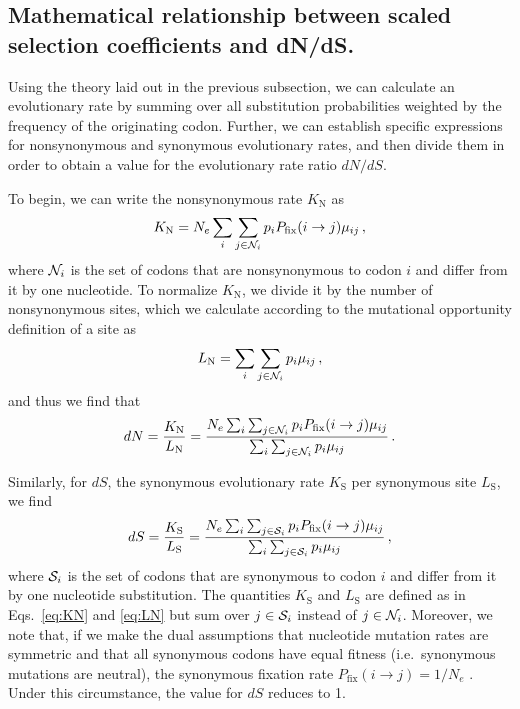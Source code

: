 \documentclass{pnastwo}
\begin{document}
\begin{article}
		
\subsection*{Mathematical relationship between scaled selection coefficients and dN/dS.} 

Using the theory laid out in the previous subsection, we can calculate an evolutionary rate by summing over all substitution probabilities weighted by the frequency of the originating codon. Further, we can establish specific expressions for nonsynonymous and synonymous evolutionary rates, and then divide them in order to obtain a value for the evolutionary rate ratio $dN/dS$.

To begin, we can write the nonsynonymous rate $K_\text{N}$ as 
\begin{equation}\label{eq:KN}
	K_\text{N} = N_e \sum_i \sum_{j \in {\cal N}_i} p_i P_\text{fix}(i \rightarrow j) \mu_{ij}\,,
\end{equation}
where ${\cal N}_i$ is the set of codons that are nonsynonymous to codon $i$ and differ from it by one nucleotide. To normalize $K_\text{N}$, we divide it by the number of nonsynonymous sites, which we calculate according to the mutational opportunity definition of a site \cite{GoldmanYang1994, Yang2006} as 
\begin{equation}\label{eq:LN}
	L_\text{N} = \sum_i \sum_{j \in {\cal N}_i} p_i \mu_{ij}\,, 
\end{equation} and thus we find that 
\begin{equation}\label{eq:dN}
	dN = \frac{K_\text{N}}{L_\text{N}}=\frac{N_e \sum_i \sum_{j \in {\cal N}_i} p_i P_\text{fix}(i \rightarrow j) \mu_{ij} } {\sum_i \sum_{j \in {\cal N}_i} p_i \mu_{ij}}\,.
\end{equation}
		
Similarly, for $dS$, the synonymous evolutionary rate $K_\text{S}$ per synonymous site $L_\text{S}$, we find
\begin{equation}\label{eq:dS}
	dS = \frac{K_\text{S}}{L_\text{S}}=\frac{ N_e \sum_i \sum_{j \in {\cal S}_i} p_i P_\text{fix}(i \rightarrow j) \mu_{ij} } {\sum_i \sum_{j \in {\cal S}_i} p_i \mu_{ij} }\,,
\end{equation}
where ${\cal S}_i$ is the set of codons that are synonymous to codon $i$ and differ from it by one nucleotide substitution. The quantities $K_\text{S}$ and $L_\text{S}$ are defined as in Eqs.~\eqref{eq:KN} and \eqref{eq:LN} but sum over $j\in {\cal S}_i$ instead of $j\in {\cal N}_i$. Moreover, we note that, if we make the dual assumptions that nucleotide mutation rates are symmetric and that all synonymous codons have equal fitness (i.e.\ synonymous mutations are neutral), the synonymous fixation rate $P_\text{fix}(i \rightarrow j)= 1/N_e$ \cite{CrowKimura1970}. Under this circumstance, the value for $dS$ reduces to 1.
		

\end{article}
\end{document}
